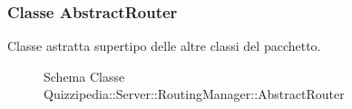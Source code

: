 \subsubsection{Classe AbstractRouter}
Classe astratta supertipo delle altre classi del pacchetto.
\begin{figure}[H]
\centering
\noindent{}
\caption{Schema Classe Quizzipedia::Server::RoutingManager::AbstractRouter}
\end{figure}
